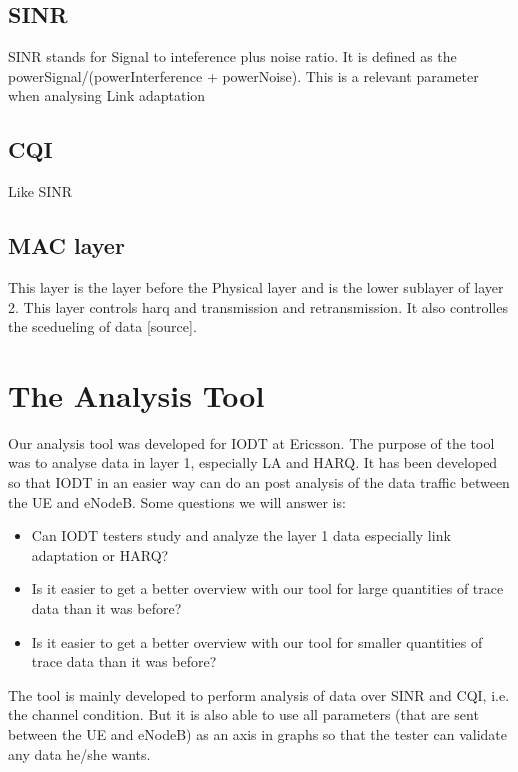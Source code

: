 \documentclass[cropmarks, frame, english]{idamasterthesis}
\begin{document}
\section{SINR}
SINR stands for Signal to inteference plus noise ratio. It is defined as the powerSignal/(powerInterference + powerNoise). This is a relevant parameter when analysing Link adaptation

\section{CQI}
Like SINR

\section{MAC layer}
This layer is the layer before the Physical layer and is the lower sublayer of layer 2. This layer controls harq and transmission and retransmission. It also controlles the scedueling of data [source].






















\chapter{The Analysis Tool} %
Our analysis tool was developed for IODT at Ericsson. The purpose of the tool was to analyse data in layer 1, especially LA and HARQ. It has been developed so that IODT in an easier way can do an post analysis of the data traffic between the UE and eNodeB. Some questions we will answer is:
\begin{itemize}
   \item Can IODT testers study and analyze the layer 1 data especially link adaptation or HARQ?
   \item Is it easier to get a better overview with our tool for large quantities of trace data than it was before?
   \item Is it easier to get a better overview with our tool for smaller quantities of trace data than it was before?
\end{itemize}


The tool is mainly developed to perform analysis of data over SINR and CQI, i.e. the channel condition. But it is also able to use all parameters (that are sent between the UE and eNodeB) as an axis in graphs so that the tester can validate any data he/she wants.
\end{document}
